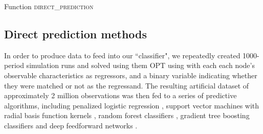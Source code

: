 \documentclass[format=acmsmall, review=false]{acmart}
\begin{document}
\begin{algorithm}[htbp]
	\SetAlgoLined
  \DontPrintSemicolon
	

	\caption{Function \textsc{direct\_prediction}}
	\label{alg:direct_prediction}
\end{algorithm}


\subsection{Direct prediction methods}

In order to produce data to feed into our ``classifier", we repeatedly created 1000-period simulation runs and solved using them OPT using with each each node's observable characteristics as regressors, and a binary variable indicating whether they were matched or not as the regressand. The resulting artificial dataset of approximately 2 million observations was then fed to a series of predictive algorithms, including penalized logistic regression \citep{wu2009genome}, support vector machines with radial basis function kernels \citep{cortes1995support}, random forest classifiers \citep{breiman2001random}, gradient tree boosting classifiers \citep{friedman2001greedy} and deep feedforward networks \citep{goodfellow2016deep}. 
\end{document}
